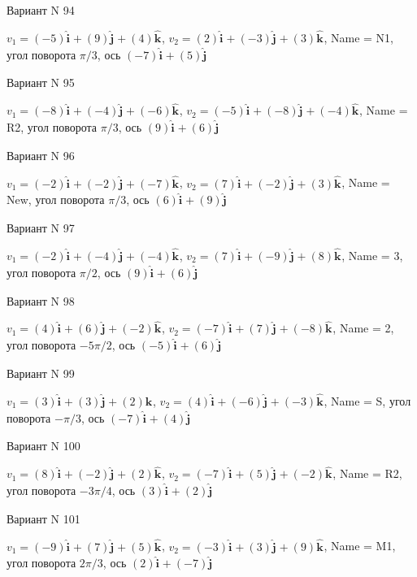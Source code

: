 \documentclass[11pt]{report}
\begin{document}
Вариант N 94

$v_1 = (-5)\mathbf{\hat{i}_{}} + (9)\mathbf{\hat{j}_{}} + (4)\mathbf{\hat{k}_{}}$, $v_2 = (2)\mathbf{\hat{i}_{}} + (-3)\mathbf{\hat{j}_{}} + (3)\mathbf{\hat{k}_{}}$, Name = N1, угол поворота $\pi / 3$, ось $(-7)\mathbf{\hat{i}_{}} + (5)\mathbf{\hat{j}_{}}$

Вариант N 95

$v_1 = (-8)\mathbf{\hat{i}_{}} + (-4)\mathbf{\hat{j}_{}} + (-6)\mathbf{\hat{k}_{}}$, $v_2 = (-5)\mathbf{\hat{i}_{}} + (-8)\mathbf{\hat{j}_{}} + (-4)\mathbf{\hat{k}_{}}$, Name = R2, угол поворота $\pi / 3$, ось $(9)\mathbf{\hat{i}_{}} + (6)\mathbf{\hat{j}_{}}$

Вариант N 96

$v_1 = (-2)\mathbf{\hat{i}_{}} + (-2)\mathbf{\hat{j}_{}} + (-7)\mathbf{\hat{k}_{}}$, $v_2 = (7)\mathbf{\hat{i}_{}} + (-2)\mathbf{\hat{j}_{}} + (3)\mathbf{\hat{k}_{}}$, Name = New, угол поворота $\pi / 3$, ось $(6)\mathbf{\hat{i}_{}} + (9)\mathbf{\hat{j}_{}}$

Вариант N 97

$v_1 = (-2)\mathbf{\hat{i}_{}} + (-4)\mathbf{\hat{j}_{}} + (-4)\mathbf{\hat{k}_{}}$, $v_2 = (7)\mathbf{\hat{i}_{}} + (-9)\mathbf{\hat{j}_{}} + (8)\mathbf{\hat{k}_{}}$, Name = 3, угол поворота $\pi / 2$, ось $(9)\mathbf{\hat{i}_{}} + (6)\mathbf{\hat{j}_{}}$

Вариант N 98

$v_1 = (4)\mathbf{\hat{i}_{}} + (6)\mathbf{\hat{j}_{}} + (-2)\mathbf{\hat{k}_{}}$, $v_2 = (-7)\mathbf{\hat{i}_{}} + (7)\mathbf{\hat{j}_{}} + (-8)\mathbf{\hat{k}_{}}$, Name = 2, угол поворота $- 5 \pi / 2$, ось $(-5)\mathbf{\hat{i}_{}} + (6)\mathbf{\hat{j}_{}}$

Вариант N 99

$v_1 = (3)\mathbf{\hat{i}_{}} + (3)\mathbf{\hat{j}_{}} + (2)\mathbf{\hat{k}_{}}$, $v_2 = (4)\mathbf{\hat{i}_{}} + (-6)\mathbf{\hat{j}_{}} + (-3)\mathbf{\hat{k}_{}}$, Name = S, угол поворота $- \pi / 3$, ось $(-7)\mathbf{\hat{i}_{}} + (4)\mathbf{\hat{j}_{}}$

Вариант N 100

$v_1 = (8)\mathbf{\hat{i}_{}} + (-2)\mathbf{\hat{j}_{}} + (2)\mathbf{\hat{k}_{}}$, $v_2 = (-7)\mathbf{\hat{i}_{}} + (5)\mathbf{\hat{j}_{}} + (-2)\mathbf{\hat{k}_{}}$, Name = R2, угол поворота $- 3 \pi / 4$, ось $(3)\mathbf{\hat{i}_{}} + (2)\mathbf{\hat{j}_{}}$

Вариант N 101

$v_1 = (-9)\mathbf{\hat{i}_{}} + (7)\mathbf{\hat{j}_{}} + (5)\mathbf{\hat{k}_{}}$, $v_2 = (-3)\mathbf{\hat{i}_{}} + (3)\mathbf{\hat{j}_{}} + (9)\mathbf{\hat{k}_{}}$, Name = M1, угол поворота $2 \pi / 3$, ось $(2)\mathbf{\hat{i}_{}} + (-7)\mathbf{\hat{j}_{}}$
\end{document}

